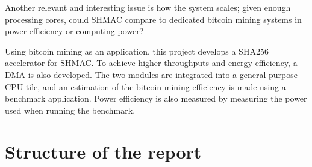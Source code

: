 Another relevant and interesting issue is how the system scales; given enough processing
cores, could SHMAC compare to dedicated bitcoin mining systems in power efficiency or
computing power?

Using bitcoin mining as an application, this project develops a SHA256 accelerator
for SHMAC. To achieve higher throughputs and energy efficiency, a DMA is also developed.
The two modules are integrated into a general-purpose CPU tile, and an estimation of the
bitcoin mining efficiency is made using a benchmark application. Power efficiency is
also measured by measuring the power used when running the benchmark.


\section{Structure of the report}
